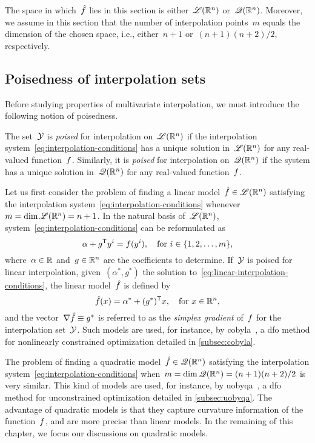 The space in which~$\objm$ lies in this section is either~$\mathscr{L}(\mathbb{R}^n)$ or~$\mathscr{Q}(\mathbb{R}^n)$.
Moreover, we assume in this section that the number of interpolation points~$m$ equals the dimension of the chosen space, i.e., either~$n + 1$ or~$(n + 1)(n + 2) / 2$, respectively.

\subsection{Poisedness of interpolation sets}
\label{subsec:poisedness}

Before studying properties of multivariate interpolation, we must introduce the following notion of poisedness.

\begin{definition}[Poisedness]
    The set~$\xpt$ is \emph{poised} for interpolation on~$\mathscr{L}(\mathbb{R}^n)$ if the interpolation system~\cref{eq:interpolation-conditions} has a unique solution in~$\mathscr{L}(\mathbb{R}^n)$ for any real-valued function~$f$.
    Similarly, it is \emph{poised} for interpolation on~$\mathscr{Q}(\mathbb{R}^n)$ if the system has a unique solution in~$\mathscr{Q}(\mathbb{R}^n)$ for any real-valued function~$f$.
\end{definition}

Let us first consider the problem of finding a linear model~$\objm \in \lpoly$ satisfying the interpolation system~\cref{eq:interpolation-conditions} whenever~$m = \dim \mathscr{L}(\mathbb{R}^n) = n + 1$.
In the natural basis of~$\mathscr{L}(\mathbb{R}^n)$, system~\cref{eq:interpolation-conditions} can be reformulated as
\begin{equation}
    \label{eq:linear-interpolation-conditions}
    \alpha + g^{\mathsf{T}} y^i = f(y^i), \quad \text{for~$i \in \{1, 2, \dots, m\}$},
\end{equation}
where~$\alpha \in \mathbb{R}$ and~$g \in \mathbb{R}^n$ are the coefficients to determine.
If~$\xpt$ is poised for linear interpolation, given~$(\alpha^{\ast}, g^{\ast})$ the solution to~\cref{eq:linear-interpolation-conditions}, the linear model~$\objm$ is defined by
\begin{equation*}
    \objm(\iter) = \alpha^{\ast} + (g^{\ast})^{\T} x, \quad \text{for~$\iter \in \R^n$},
\end{equation*}
and the vector~$\nabla \objm \equiv g^{\ast}$ is referred to as the \emph{simplex gradient} of~$f$ for the interpolation set~$\xpt$.
Such models are used, for instance, by \gls{cobyla}~\cite{Powell_1994}, a \gls{dfo} method for nonlinearly constrained optimization detailed in \cref{subsec:cobyla}.

The problem of finding a quadratic model~$\objm \in \qpoly$ satisfying the interpolation system~\cref{eq:interpolation-conditions} when~$m = \dim \mathscr{Q}(\mathbb{R}^n) = (n + 1)(n + 2) / 2$ is very similar.
This kind of models are used, for instance, by \gls{uobyqa}~\cite{Powell_2002}, a \gls{dfo} method for unconstrained optimization detailed in \cref{subsec:uobyqa}.
The advantage of quadratic models is that they capture curvature information of the function~$f$, and are more precise than linear models.
In the remaining of this chapter, we focus our discussions on quadratic models.

